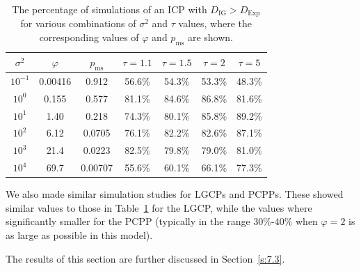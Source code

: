 \documentclass[alpha-refs]{wiley-article}
\begin{document}
\begin{table}
	\centering
	\begin{tabular}{c|c|c|c|c|c|c}
		$\sigma^2$ & $\varphi$ & $p_\textrm{ms}$ & $\tau=1.1$ & $\tau=1.5$ & $\tau=2$ & $\tau=5$  \\
		\hline\hline
		$10^{-1}$  & 0.00416 & 0.912 & 56.6\% & 54.3\% & 53.3\% & 48.3\% \\
		$10^0$     & 0.155   & 0.577 & 81.1\% & 84.6\% & 86.8\% & 81.6\% \\
		$10^1$     & 1.40    & 0.218 & 74.3\% & 80.1\% & 85.8\% & 89.2\% \\
		$10^2$     & 6.12    & 0.0705& 76.1\% & 82.2\% & 82.6\% & 87.1\% \\
		$10^3$     & 21.4    & 0.0223& 82.5\% & 79.8\% & 79.0\% & 81.0\% \\
		$10^4$     & 69.7    &0.00707& 55.6\% & 60.1\% & 66.1\% & 77.3\% \\
	\end{tabular}
	\caption{The percentage of simulations of an ICP with $D_\text{IG}>D_\text{Exp}$ for various combinations of $\sigma^2$ and $\tau$ values, where the corresponding values of $\varphi$ and $p_\mathrm{ms}$ are shown.} 
	\label{tab:comparison}
\end{table}

We also made similar simulation studies for LGCPs and PCPPs. These showed similar values to those in Table~\ref{tab:comparison} for the LGCP, while the values where significantly smaller for the PCPP (typically in the range $30\%$-$40\%$ when $\varphi=2$ is as large as possible in this model).

The results of this section are further discussed in Section~\ref{s:7.3}.





\end{document}
